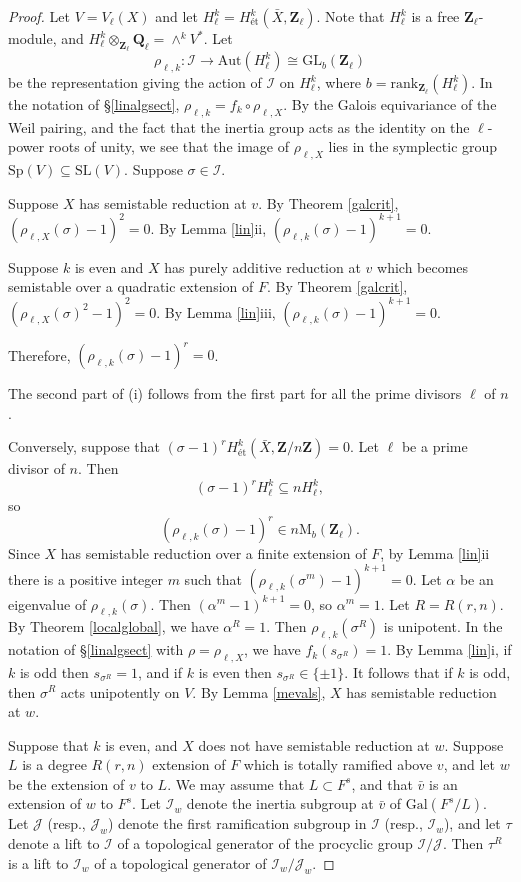 \documentclass{amsart}
\def\Q{{\mathbf Q}}
\def\Z{{\mathbf Z}}
\def\Gal{\mathrm{Gal}}
\def\Aut{\mathrm{Aut}}
\def\I{{\mathcal I}}
\def\J{{\mathcal J}}
\def\rank{\mathrm{rank}}
\def\GL{\mathrm{GL}}
\def\SL{\mathrm{SL}}
\def\Sp{\mathrm{Sp}}
\def\M{\mathrm{M}}
\theoremstyle{definition}
\begin{document}
\begin{proof}
Let $V = V_\ell(X)$ and let 
$H^k_\ell = H^k_{\text{\'et}}({\bar X}, \Z_\ell)$.
Note that $H^k_\ell$ is a free $\Z_\ell$-module, and
$H^k_\ell \otimes_{\Z_\ell}\Q_\ell = \wedge^kV^\ast$.
Let
$$\rho_{\ell,k} : \I \to \Aut(H^k_\ell) \cong \GL_b(\Z_\ell)$$
be the representation giving the action of $\I$ on $H^k_\ell$,
where $b=\rank_{\Z_{\ell}}(H^k_\ell)$.
In the notation of \S\ref{linalgsect},
$\rho_{\ell,k}=f_{k}\circ\rho_{\ell,X}$.
By the Galois equivariance of the Weil pairing, and the fact that
the inertia group acts as the identity on the $\ell$-power roots
of unity, we see that the image of $\rho_{\ell,X}$ lies in the
symplectic group $\Sp(V) \subseteq \SL(V)$. 
Suppose $\sigma \in \I$. 

Suppose $X$ has semistable reduction at $v$.
By Theorem \ref{galcrit}, $(\rho_{\ell,X}(\sigma) - 1)^{2} = 0$.
By Lemma \ref{lin}ii, $(\rho_{\ell,k}(\sigma) - 1)^{k+1} = 0$.

Suppose $k$ is even and
$X$ has purely additive reduction at $v$ which becomes
semistable over a quadratic extension of $F$. 
By Theorem \ref{galcrit}, 
$(\rho_{\ell,X}(\sigma)^2-1)^2=0$. 
By Lemma \ref{lin}iii, $(\rho_{\ell,k}(\sigma) - 1)^{k+1} = 0$.

Therefore,  $(\rho_{\ell,k}(\sigma) - 1)^{r} = 0$.

The second part of (i) follows from the first part for all
the prime divisors $\ell$ of $n$.

Conversely, suppose that 
$(\sigma - 1)^{r}H^k_{\text{\'et}}({\bar X}, \Z/n\Z) = 0$. 
Let $\ell$ be a prime divisor of $n$. Then
$$(\sigma - 1)^{r}H^k_\ell \subseteq nH^k_\ell,$$
so
$$(\rho_{\ell,k}(\sigma) - 1)^{r} \in n\M_b(\Z_\ell).$$
Since $X$ has semistable reduction over a finite extension of $F$,
by Lemma \ref{lin}ii there is a positive integer $m$ such that
$(\rho_{\ell,k}(\sigma^m) - 1)^{k+1} = 0$.
Let $\alpha$ be an eigenvalue of 
$\rho_{\ell,k}(\sigma)$. 
Then $(\alpha^m - 1)^{k+1} = 0$, so $\alpha^m = 1$.
Let $R=R(r,n)$.
By Theorem \ref{localglobal},
we have $\alpha^{R} = 1$.
Then $\rho_{\ell,k}(\sigma^{R})$ is unipotent.
In the notation of \S\ref{linalgsect} 
with $\rho=\rho_{\ell,X}$, 
we have
$f_k(s_{\sigma^{R}}) = 1$.
By Lemma \ref{lin}i,
if $k$ is odd then $s_{\sigma^{R}} = 1$, and
if $k$ is even then $s_{\sigma^{R}} \in \{\pm 1\}$.
It follows that if $k$ is odd, then $\sigma^{R}$ acts unipotently on
$V$. By Lemma \ref{mevals}, $X$ has semistable reduction at $w$.

Suppose that $k$ is even, and
$X$ does not have semistable reduction at $w$.
Suppose $L$ is a degree $R(r,n)$ extension of $F$ which is
totally ramified above $v$, and let $w$ be the extension of
$v$ to $L$.
We may assume that $L \subset F^{s}$, and that ${\bar v}$ is an
extension of $w$ to $F^{s}$. 
Let $\I_{w}$ denote the inertia
subgroup at ${\bar v}$ of $\Gal(F^{s}/L)$.
Let $\J$ (resp., $\J_{w}$) denote the first ramification subgroup
in $\I$ (resp., $\I_{w}$), and let
$\tau$ denote a lift to $\I$ of a topological generator of the 
procyclic group $\I/\J$.
Then $\tau^{R}$ is a lift to $\I_{w}$ of
a topological generator of $\I_{w}/\J_{w}$.


\end{proof}
\end{document}
